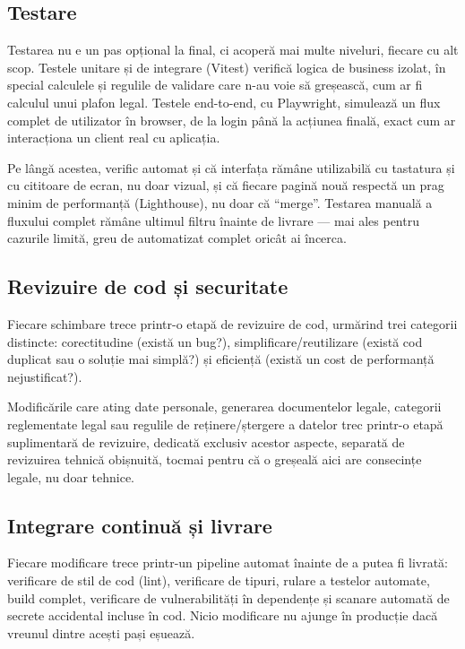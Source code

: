 \documentclass[11pt, a4paper]{article}
\begin{document}
\subsection{Testare}

Testarea nu e un pas opțional la final, ci acoperă mai multe niveluri, fiecare cu alt scop.
Testele unitare și de integrare (Vitest) verifică logica de business izolat, în special calculele
și regulile de validare care n-au voie să greșească, cum ar fi calculul unui plafon legal.
Testele end-to-end, cu Playwright, simulează un flux complet de utilizator în browser, de la
login până la acțiunea finală, exact cum ar interacționa un client real cu aplicația.

Pe lângă acestea, verific automat și că interfața rămâne utilizabilă cu tastatura și cu cititoare
de ecran, nu doar vizual, și că fiecare pagină nouă respectă un prag minim de performanță
(Lighthouse), nu doar că ``merge''. Testarea manuală a fluxului complet rămâne ultimul filtru
înainte de livrare — mai ales pentru cazurile limită, greu de automatizat complet oricât ai
încerca.

\subsection{Revizuire de cod și securitate}

Fiecare schimbare trece printr-o etapă de revizuire de cod, urmărind trei categorii distincte:
corectitudine (există un bug?), simplificare/reutilizare (există cod duplicat sau o soluție mai
simplă?) și eficiență (există un cost de performanță nejustificat?).

Modificările care ating date personale, generarea documentelor legale, categorii reglementate
legal sau regulile de reținere/ștergere a datelor trec printr-o etapă suplimentară de revizuire,
dedicată exclusiv acestor aspecte, separată de revizuirea tehnică obișnuită, tocmai pentru că
o greșeală aici are consecințe legale, nu doar tehnice.

\subsection{Integrare continuă și livrare}

Fiecare modificare trece printr-un pipeline automat înainte de a putea fi livrată: verificare de
stil de cod (lint), verificare de tipuri, rulare a testelor automate, build complet, verificare
de vulnerabilități în dependențe și scanare automată de secrete accidental incluse în cod.
Nicio modificare nu ajunge în producție dacă vreunul dintre acești pași eșuează.
\end{document}
